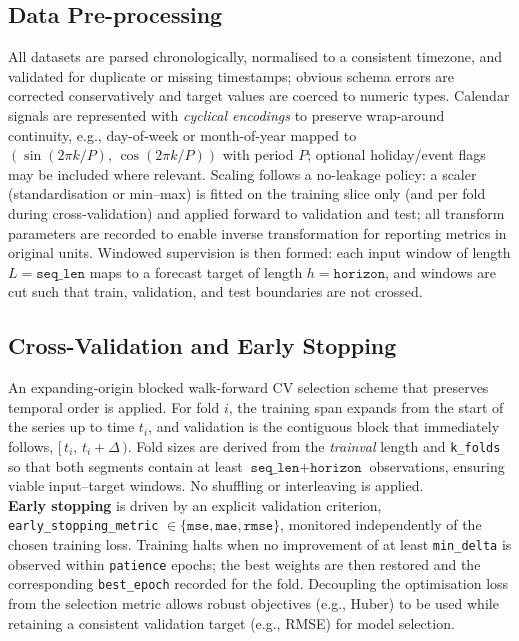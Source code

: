 \documentclass[conference]{IEEEtran}
\begin{document}
\subsection{\textbf{Data Pre-processing}}    
All datasets are parsed chronologically, normalised to a consistent timezone, and validated for duplicate or missing timestamps; obvious schema errors are corrected conservatively and target values are coerced to numeric types. Calendar signals are represented with \emph{cyclical encodings} to preserve wrap-around continuity, e.g., day-of-week or month-of-year mapped to $(\sin(2\pi k/P),\,\cos(2\pi k/P))$ with period $P$; optional holiday/event flags may be included where relevant. Scaling follows a no-leakage policy: a scaler (standardisation or min–max) is fitted on the training slice only (and per fold during cross-validation) and applied forward to validation and test; all transform parameters are recorded to enable inverse transformation for reporting metrics in original units. Windowed supervision is then formed: each input window of length $L=\texttt{seq\_len}$ maps to a forecast target of length $h=\texttt{horizon}$, and windows are cut such that train, validation, and test boundaries are not crossed.

\subsection{\textbf{Cross-Validation and Early Stopping}}

\noindent An expanding‑origin blocked walk-forward CV selection scheme that preserves temporal order is applied. For fold $i$, the training span expands from the start of the series up to time $t_i$, and validation is the contiguous block that immediately follows, $[\,t_i,\, t_i{+}\Delta\,)$. Fold sizes are derived from the \textit{trainval} length and \texttt{k\_folds} so that both segments contain at least $\texttt{seq\_len}{+}\texttt{horizon}$ observations, ensuring viable input--target windows. No shuffling or interleaving is applied.\\

\noindent\textbf{Early stopping} is driven by an explicit validation criterion, \texttt{early\_stopping\_metric} $\in \{\texttt{mse}, \texttt{mae}, \texttt{rmse}\}$, monitored independently of the chosen training loss. Training halts when no improvement of at least \texttt{min\_delta} is observed within \texttt{patience} epochs; the best weights are then restored and the corresponding \texttt{best\_epoch} recorded for the fold. Decoupling the optimisation loss from the selection metric allows robust objectives (e.g., Huber) to be used while retaining a consistent validation target (e.g., RMSE) for model selection.
\end{document}
